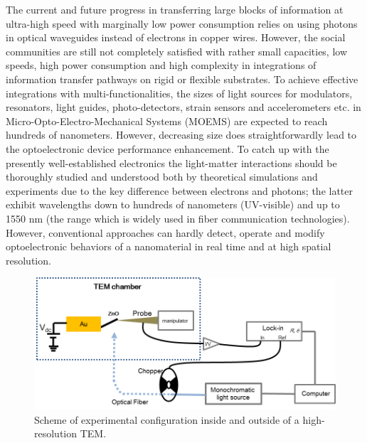 The current and future progress in transferring large blocks of information at ultra-high speed with marginally low power consumption relies on using photons in optical waveguides instead of electrons in copper wires. However, the social communities are still not completely satisfied with rather small capacities, low speeds, high power consumption and high complexity in integrations of information transfer pathways on rigid or flexible substrates.\cite{C.2009, T.2004, D.2004}
To achieve effective integrations with multi-functionalities, the sizes of light sources for modulators, resonators, light guides, photo-detectors, strain sensors and accelerometers etc. in Micro-Opto-Electro-Mechanical Systems (MOEMS) are expected to reach hundreds of nanometers.\cite{E.2007} However, decreasing size does straightforwardly lead to the optoelectronic device performance enhancement. To catch up with the presently well-established electronics the light-matter interactions should be thoroughly studied and understood both by theoretical simulations and experiments due to the key difference between electrons and photons; the latter exhibit wavelengths down to hundreds of nanometers (UV-visible) and up to ~ 1550 nm (the range which is widely used in fiber communication technologies). However, conventional approaches can hardly detect, operate and modify optoelectronic behaviors of a nanomaterial in real time and at high spatial resolution. 

\begin{figure}  
\includegraphics[width=\textwidth]{figures/figure5_1}
\caption[Experimental setup for ZnO.]{Scheme of experimental configuration inside and outside of a high-resolution TEM.
\label{fig:5_1}}
\end{figure}

